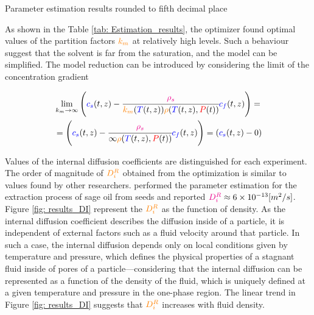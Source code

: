 \documentclass[../Article_Model_Parameters.tex]{subfiles}
\begin{document}
	
	\begin{table}[!h]
		\centering
		\caption{Parameter estimation results rounded to fifth decimal place}
		\label{tab: Estimation_results}
	\end{table}
	
	As shown in the Table \ref{tab: Estimation_results}, the optimizer found optimal values of the partition factors ${\color{orange}k_m}$ at relatively high levels. Such a behaviour suggest that the solvent is far from the saturation, and the model can be simplified. The model reduction can be introduced by considering the limit of the concentration gradient
	
	{\footnotesize
	\begin{equation*}
		\begin{split}
			&\lim_{k_m \rightarrow \infty} \left({\color{blue}{\color{blue} c_s} }(t,z)  - \cfrac{{\color{magenta}\rho_s}}{{\color{orange}k_m}({\color{blue}T}(t,z)){\color{orange}\rho}({\color{blue}T}(t,z),{\color{red}P}(t))}  {\color{blue}c_f}(t,z) \right)  = \\
			&= \left({\color{blue}{\color{blue} c_s} }(t,z)  - \cfrac{{\color{magenta}\rho_s}}{\infty{\color{orange}\rho}({\color{blue}T}(t,z),{\color{red}P}(t))}  {\color{blue}c_f}(t,z) \right) = \left({\color{blue}{\color{blue} c_s} }(t,z) - 0 \right)
		\end{split}
	\end{equation*} }
		
	Values of the internal diffusion coefficients are distinguished for each experiment. The order of magnitude of ${\color{orange}D_i^R}$ obtained from the optimization is similar to values found by other researchers. \citet{Reverchon1996} performed the parameter estimation for the extraction process of sage oil from seeds and reported ${\color{magenta}D_i^R} \approx 6\times 10^{-13}[m^2/s]$. Figure \ref{fig: results_DI} represent the ${\color{orange}D_i^R}$ as the function of density. As the internal diffusion coefficient describes the diffusion inside of a particle, it is independent of external factors such as a fluid velocity around that particle. In such a case, the internal diffusion depends only on local conditions given by temperature and pressure, which defines the physical properties of a stagnant fluid inside of pores of a particle—considering that the internal diffusion can be represented as a function of the density of the fluid, which is uniquely defined at a given temperature and pressure in the one-phase region. The linear trend in Figure \ref{fig: results_DI} suggests that ${\color{orange}D_i^R}$ increases with fluid density.
	
\end{document}
